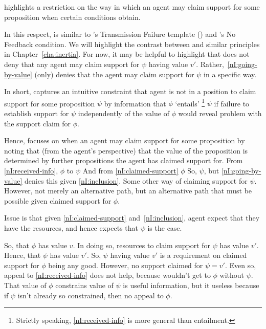 \begin{note}
  \nI{} highlights a restriction on the way in which an agent may claim support for some proposition when certain conditions obtain.

  In this respect, \nI{} is similar to \citeauthor{Wright:2011wn}'s Transmission Failure template (\citeyear{Wright:2003aa,Wright:2011wn}) and \citeauthor{Weisberg:2010to}'s No Feedback condition.
  We will highlight the contrast between \nI{} and similar principles in Chapter~\ref{cha:inertia}.
  For now, it may be helpful to highlight that \nI{} does not deny that any agent may claim support for \(\psi\) having value \(v'\).
  Rather,~\ref{nI:going-by-value} (only) denies that the agent may claim support for \(\psi\) in a specific way.

  In short, \nI{} captures an intuitive constraint that agent is not in a position to claim support for some proposition \(\psi\) by information that \(\phi\) `entails'\nolinebreak
  \footnote{Strictly speaking, \ref{nI:received-info} is more general than entailment.}
  \(\psi\) if failure to establish support for \(\psi\) independently of the value of \(\phi\) would reveal problem with the support claim for \(\phi\).

  Hence, \nI{} focuses on when an agent may claim support for some proposition by noting that (from the agent's perspective) that the value of the proposition is determined by further propositions the agent has claimed support for.
  From \ref{nI:received-info}, \(\phi\) to \(\psi\)
  And from \ref{nI:claimed-support} \(\phi\)
  So, \(\psi\), but \ref{nI:going-by-value} denies this given \ref{nI:inclusion}.
  Some other way of claiming support for \(\psi\).
  However, not merely an alternative path, but an alternative path that must be possible given claimed support for \(\phi\).

  Issue is that given \ref{nI:claimed-support} and~\ref{nI:inclusion}, agent expect that they have the resources, and hence expects that \(\psi\) is the case.

  So, that \(\phi\) has value \(v\).
  In doing so, resources to claim support for \(\psi\) has value \(v'\).
  Hence, that \(\psi\) has value \(v'\).
  So, \(\psi\) having value \(v'\) is a requirement on claimed support for \(\phi\) being any good.
  However, no support claimed for \(\psi = v'\).
  Even so, appeal to \ref{nI:received-info} does not help, because wouldn't get to \(\phi\) without \(\psi\).
  That value of \(\phi\) constrains value of \(\psi\) is useful information, but it useless because if \(\psi\) isn't already so constrained, then no appeal to \(\phi\).


\end{note}
